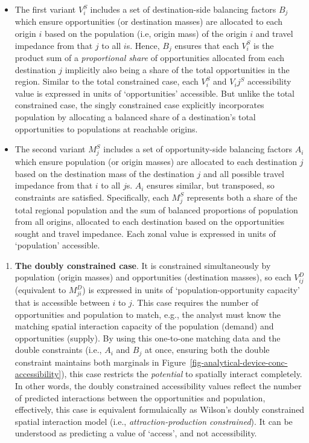 \documentclass[
]{article}
\providecommand{\tightlist}{%
  \setlength{\itemsep}{0pt}\setlength{\parskip}{0pt}}\usepackage{longtable,booktabs,array}
\begin{document}
\begin{itemize}
\tightlist
\item
  The first variant \(V_i^S\) includes a set of destination-side
  balancing factors \(B_j\) which ensure opportunities (or destination
  masses) are allocated to each origin \(i\) based on the population
  (i.e, origin mass) of the origin \(i\) and travel impedance from that
  \(j\) to all \(i\)s. Hence, \(B_j\) ensures that each \(V_i^S\) is the
  product sum of a \emph{proportional share} of opportunities allocated
  from each destination \(j\) implicitly also being a share of the total
  opportunities in the region. Similar to the total constrained case,
  each \(V_i^S\) and \(V_ij^S\) accessibility value is expressed in
  units of `opportunities' accessible. But unlike the total constrained
  case, the singly constrained case explicitly incorporates population
  by allocating a balanced share of a destination's total opportunities
  to populations at reachable origins.
\item
  The second variant \(M_j^S\) includes a set of opportunity-side
  balancing factors \(A_i\) which ensure population (or origin masses)
  are allocated to each destination \(j\) based on the destination mass
  of the destination \(j\) and all possible travel impedance from that
  \(i\) to all \(j\)s. \(A_i\) ensures similar, but transposed, so
  constraints are satisfied. Specifically, each \(M_j^S\) represents
  both a share of the total regional population and the sum of balanced
  proportions of population from all origins, allocated to each
  destination based on the opportunities sought and travel impedance.
  Each zonal value is expressed in units of `population' accessible.
\end{itemize}

\begin{enumerate}
\def\labelenumi{\arabic{enumi}.}
\setcounter{enumi}{3}
\tightlist
\item
  \textbf{The doubly constrained case}. It is constrained simultaneously
  by population (origin masses) and opportunities (destination masses),
  so each \(V_{ij}^D\) (equivalent to \(M_{ji}^D\)) is expressed in
  units of `population-opportunity capacity' that is accessible between
  \(i\) to \(j\). This case requires the number of opportunities and
  population to match, e.g., the analyst must know the matching spatial
  interaction capacity of the population (demand) and opportunities
  (supply). By using this one-to-one matching data and the double
  constraints (i.e., \(A_i\) and \(B_j\) at once, ensuring both the
  double constraint maintains both marginals in
  Figure~\ref{fig-analytical-device-conc-accessibility}), this case
  restricts the \emph{potential} to spatially interact completely. In
  other words, the doubly constrained accessibility values reflect the
  number of predicted interactions between the opportunities and
  population, effectively, this case is equivalent formulaically as
  Wilson's doubly constrained spatial interaction model (i.e.,
  \emph{attraction-production constrained}). It can be understood as
  predicting a value of `access', and not accessibility.
\end{enumerate}
\end{document}
